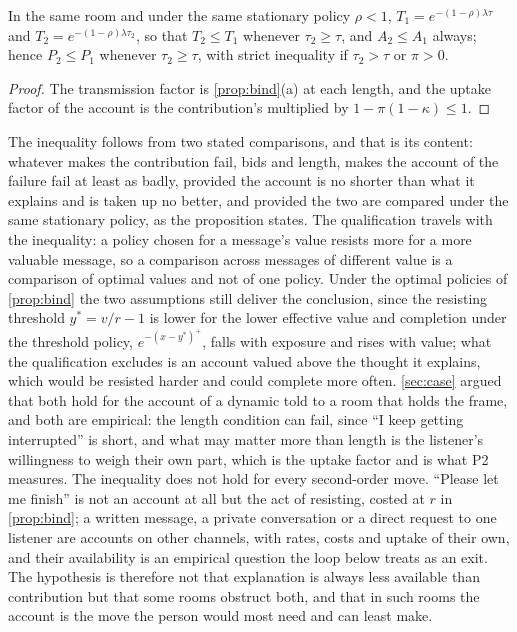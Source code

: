 \begin{proposition}\label{prop:cassandra}
In the same room and under the same stationary policy $\rho < 1$, $T_1 = e^{-(1-\rho)\lambda\tau}$ and $T_2 = e^{-(1-\rho)\lambda\tau_2}$, so that $T_2 \le T_1$ whenever $\tau_2 \ge \tau$, and $A_2 \le A_1$ always; hence $P_2 \le P_1$ whenever $\tau_2 \ge \tau$, with strict inequality if $\tau_2 > \tau$ or $\pi > 0$.
\end{proposition}

\begin{proof}
The transmission factor is \autoref{prop:bind}(a) at each length, and the uptake factor of the account is the contribution's multiplied by $1 - \pi(1-\kappa) \le 1$.
\end{proof}

The inequality follows from two stated comparisons, and that is its content: whatever makes the contribution fail, bids and length, makes the account of the failure fail at least as badly, provided the account is no shorter than what it explains and is taken up no better, and provided the two are compared under the same stationary policy, as the proposition states. The qualification travels with the inequality: a policy chosen for a message's value resists more for a more valuable message, so a comparison across messages of different value is a comparison of optimal values and not of one policy. Under the optimal policies of \autoref{prop:bind} the two assumptions still deliver the conclusion, since the resisting threshold $y^{*} = v/r - 1$ is lower for the lower effective value and completion under the threshold policy, $e^{-(x - y^{*})^{+}}$, falls with exposure and rises with value; what the qualification excludes is an account valued above the thought it explains, which would be resisted harder and could complete more often. \autoref{sec:case} argued that both hold for the account of a dynamic told to a room that holds the frame, and both are empirical: the length condition can fail, since ``I keep getting interrupted'' is short, and what may matter more than length is the listener's willingness to weigh their own part, which is the uptake factor and is what P2 measures. The inequality does not hold for every second-order move. ``Please let me finish'' is not an account at all but the act of resisting, costed at $r$ in \autoref{prop:bind}; a written message, a private conversation or a direct request to one listener are accounts on other channels, with rates, costs and uptake of their own, and their availability is an empirical question the loop below treats as an exit. The hypothesis is therefore not that explanation is always less available than contribution but that some rooms obstruct both, and that in such rooms the account is the move the person would most need and can least make.
